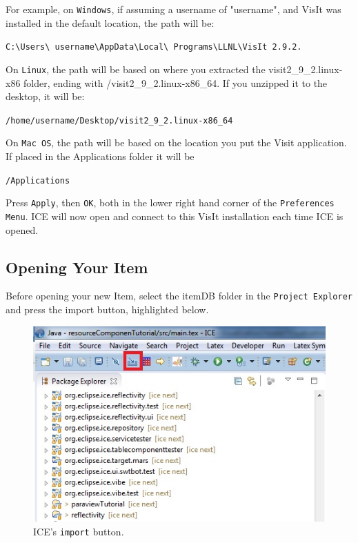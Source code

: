 For example, on \texttt{Windows}, if assuming a username of "username", and
VisIt was installed in the default location, the path will be:

\texttt{C:\textbackslash Users\textbackslash
username\textbackslash AppData\textbackslash Local\textbackslash
Programs\textbackslash LLNL\textbackslash VisIt 2.9.2.}

On \texttt{Linux}, the path will be based on where you extracted the 
visit2\_9\_2.linux-x86 folder, ending with /visit2\_9\_2.linux-x86\_64. If
you unzipped it to the desktop, it will be:
 
\texttt{/home/username/Desktop/visit2\_9\_2.linux-x86\_64}

On \texttt{Mac OS}, the path will be based on the location you put the Visit
application. If placed in the Applications folder it will be

\texttt{/Applications}

Press \texttt{Apply}, then \texttt{OK}, both in the lower right hand corner of
the \texttt{Preferences Menu}.
ICE will now open and connect to this VisIt installation each time ICE is opened.

\subsection{Opening Your Item}
Before opening your new Item, select the itemDB folder in the \texttt{Project
Explorer} and press the import button, highlighted below.

\begin{figure}[!h]
\includegraphics[width=12cm]{images/ImportButton}
\centering
\caption{ICE's \texttt{import} button.}
\label{fig:importbutton}
\end{figure}

